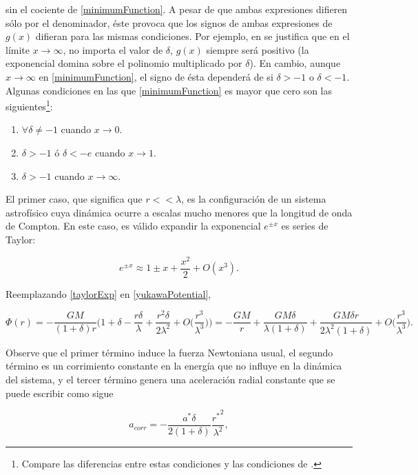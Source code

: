 \documentclass{article}
\begin{document}
sin el cociente de \eqref{minimumFunction}. A pesar de que ambas expresiones difieren sólo por el denominador, éste provoca que los signos de ambas expresiones de $g(x)$ difieran para las mismas condiciones. Por ejemplo, en \cite{Capozziello} se justifica que en el límite $x\rightarrow\infty$, no importa el valor de  $\delta$, $g(x)$ siempre será positivo (la exponencial domina sobre el polinomio multiplicado por $\delta$). En cambio, aunque $x\rightarrow\infty$ en \eqref{minimumFunction}, el signo de ésta dependerá de si $\delta>-1$ o $\delta<-1$. Algunas condiciones en las que \eqref{minimumFunction} es mayor que cero son las siguientes\footnote{Compare las diferencias entre estas condiciones y las condiciones de \cite{Capozziello}.}:

\begin{enumerate}
	\item $\forall\delta\neq-1$ cuando $x\rightarrow 0$.
	\item $\delta>-1$ ó $\delta<-e$ cuando $x\rightarrow 1$.
	\item $\delta>-1$ cuando $x\rightarrow\infty$.
\end{enumerate}

El primer caso, que significa que $r<<\lambda$, es la configuración de un sistema astrofísico cuya dinámica ocurre a escalas mucho menores que la longitud de onda de Compton. En este caso, es válido expandir la exponencial $e^{\pm x}$ es series de Taylor:

\begin{equation}\label{taylorExp}
	e^{\pm x}\approx 1\pm x+\frac{x^2}{2}+O(x^3).
\end{equation}

Reemplazando \eqref{taylorExp} en \eqref{yukawaPotential},

$$\Phi(r)=-\frac{GM}{(1+\delta)r}\Big(1+\delta-\frac{r\delta}{\lambda}+\frac{r^2\delta}{2\lambda^2}+O\Big(\frac{r^3}{\lambda^3}\Big)\Big)=-\frac{GM}{r}+\frac{GM\delta}{\lambda(1+\delta)}+\frac{GM\delta r}{2\lambda^2(1+\delta)}+O\Big(\frac{r^3}{\lambda^3}\Big).$$

Observe que el primer término induce la fuerza Newtoniana usual, el segundo término es un corrimiento constante en la energía que no influye en la dinámica del sistema, y el tercer término genera una aceleración radial constante que se puede escribir como sigue

\begin{equation}\label{pioneer}
	a_{corr}=-\frac{a^*\delta}{2(1+\delta)}\frac{{r^*}^2}{\lambda^2},
\end{equation}
\end{document}
